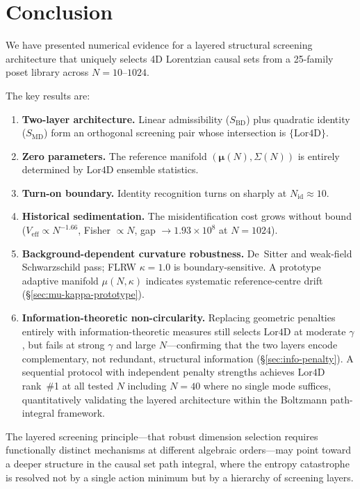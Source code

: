 \documentclass[12pt,a4paper]{article}
\newcommand{\SBD}{S_{\mathrm{BD}}}
\newcommand{\SMD}{S_{\mathrm{MD}}}
\newcommand{\Lor}{\mathrm{Lor4D}}
\newcommand{\Veff}{V_{\mathrm{eff}}}
\begin{document}
\section{Conclusion}
\label{sec:conclusion}

We have presented numerical evidence for a layered structural screening
architecture that uniquely selects 4D Lorentzian causal sets from a 25-family
poset library across $N=10$--$1024$.

The key results are:
\begin{enumerate}
\item \textbf{Two-layer architecture.}
  Linear admissibility ($\SBD$) plus quadratic identity ($\SMD$) form an
  orthogonal screening pair whose intersection is $\{\Lor\}$.
\item \textbf{Zero parameters.}
  The reference manifold $(\bm{\mu}(N),\Sigma(N))$ is entirely determined by
  $\Lor$ ensemble statistics.
\item \textbf{Turn-on boundary.}
  Identity recognition turns on sharply at $N_{\mathrm{id}}\approx 10$.
\item \textbf{Historical sedimentation.}
  The misidentification cost grows without bound
  ($\Veff\propto N^{-1.66}$, Fisher $\propto N$,
  gap $\to 1.93\times 10^8$ at $N=1024$).
\item \textbf{Background-dependent curvature robustness.}
  De~Sitter and weak-field Schwarzschild pass; FLRW $\kappa=1.0$ is
  boundary-sensitive. A prototype adaptive manifold $\mu(N,\kappa)$
  indicates systematic reference-centre drift (\S\ref{sec:mu-kappa-prototype}).
\item \textbf{Information-theoretic non-circularity.}
  Replacing geometric penalties entirely with information-theoretic measures
  still selects $\Lor$ at moderate $\gamma$, but fails at strong $\gamma$
  and large $N$---confirming that the two layers encode complementary, not
  redundant, structural information (\S\ref{sec:info-penalty}).
  A sequential protocol with independent penalty strengths achieves $\Lor$
  rank~\#1 at all tested $N$ including $N=40$ where no single mode suffices,
  quantitatively validating the layered architecture within the Boltzmann
  path-integral framework.
\end{enumerate}

The layered screening principle---that robust dimension selection requires
functionally distinct mechanisms at different algebraic orders---may point toward
a deeper structure in the causal set path integral, where the entropy catastrophe
is resolved not by a single action minimum but by a hierarchy of screening layers.
\end{document}
